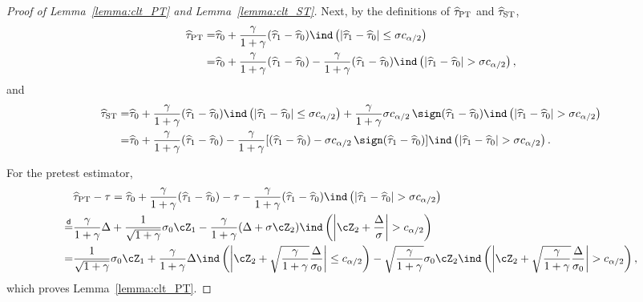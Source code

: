 \documentclass[11pt]{article}
\newcommand{\htau}{\widehat\tau}
\numberwithin{equation}{section}
\theoremstyle{definition}
\begin{document}
\begin{proof}[Proof of Lemma~\ref{lemma:clt_PT} and Lemma~\ref{lemma:clt_ST}]
Next, by the definitions of $\htau_{\rm PT}$ and $\htau_{\rm ST}$,
\begin{align*}
\htau_{\rm PT} =& \htau_0 + \frac{\gamma}{1+\gamma} (\htau_1 - \htau_0) \ind\left(\lvert \htau_1 - \htau_0 \rvert \le \sigma c_{\alpha/2}\right)\\
=& \htau_0 + \frac{\gamma}{1+\gamma} (\htau_1 - \htau_0) - \frac{\gamma}{1+\gamma} (\htau_1 - \htau_0) \ind\left(\lvert \htau_1 - \htau_0 \rvert >  \sigma c_{\alpha/2}\right),
\end{align*}
and
\begin{align*}
\htau_{\rm ST}=& \htau_0 + \frac{\gamma}{1+\gamma} (\htau_1 - \htau_0)\ind\left(\lvert \htau_1 - \htau_0 \rvert \le \sigma c_{\alpha/2}\right) + \frac{\gamma}{1+\gamma} \sigma c_{\alpha/2}\,\sign(\htau_1 - \htau_0)\ind\left(\lvert \htau_1 - \htau_0 \rvert > \sigma c_{\alpha/2}\right)\\
=& \htau_0 + \frac{\gamma}{1+\gamma} (\htau_1 - \htau_0) - \frac{\gamma}{1+\gamma} [(\htau_1 - \htau_0) - \sigma c_{\alpha/2}\,\sign(\htau_1 - \htau_0)] \ind\left(\lvert \htau_1 - \htau_0 \rvert >  \sigma c_{\alpha/2}\right).
\end{align*}

For the pretest estimator,
\begin{align*}
  &\htau_{\rm PT} - \tau =\htau_0 + \frac{\gamma}{1+\gamma} (\htau_1 - \htau_0) - \tau - \frac{\gamma}{1+\gamma} (\htau_1 - \htau_0) \ind\left(\lvert \htau_1 - \htau_0 \rvert >  \sigma c_{\alpha/2}\right)\\
  \stackrel{\sf d}{=}& \frac{\gamma}{1+\gamma} \Delta + \frac{1}{\sqrt{1+\gamma}} \sigma_0 \cZ_1 - \frac{\gamma}{1+\gamma} (\Delta + \sigma \cZ_2) \ind\left(\left\lvert \cZ_2 + \frac{\Delta}{\sigma}\right\rvert > c_{\alpha/2}\right)\\
  =&   \frac{1}{\sqrt{1+\gamma}}\sigma_0\cZ_1 +  \frac{\gamma}{1+\gamma} \Delta\ind\left(\left\lvert \cZ_2 + \sqrt{\frac{\gamma}{1+\gamma}}\frac{\Delta}{\sigma_0}\right\rvert \le c_{\alpha/2}\right) - \sqrt{\frac{\gamma}{1+\gamma}}\sigma_0\cZ_2\ind\left(\left\lvert \cZ_2 + \sqrt{\frac{\gamma}{1+\gamma}}\frac{\Delta}{\sigma_0}\right\rvert > c_{\alpha/2}\right),
\end{align*}
which proves Lemma~\ref{lemma:clt_PT}.


\end{proof}
\end{document}
